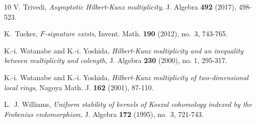 \documentclass[11pt, reqno]{amsart}
\theoremstyle{plain}
\theoremstyle{plain}
\begin{document}
\begin{thebibliography}{10}
 V. Trivedi, \emph{Asymptotic Hilbert-Kunz multiplicity}, J. Algebra \textbf{492} (2017), 498-523.

 K.~Tucker, \emph{$F$-signature exists}, Invent. Math. \textbf{190} (2012), no.~3, 743-765.


 K.-i. Watanabe and K.-i. Yoshida, \emph{Hilbert-Kunz multiplicity and an inequality between multiplicity and colength}, J. Algebra \textbf{230} (2000), no. 1, 295-317.

 K.-i. Watanabe and K.-i. Yoshida, \emph{Hilbert-Kunz multiplicity of two-dimensional local rings}, Nagoya Math. J. \textbf{162} (2001), 87-110.

L.~J. Williams, \emph{Uniform stability of kernels of Koszul cohomology indexed by the Frobenius endomorphism},
J. Algebra \textbf{172} (1995), no.~3, 721-743.


\end{thebibliography}
\end{document}
